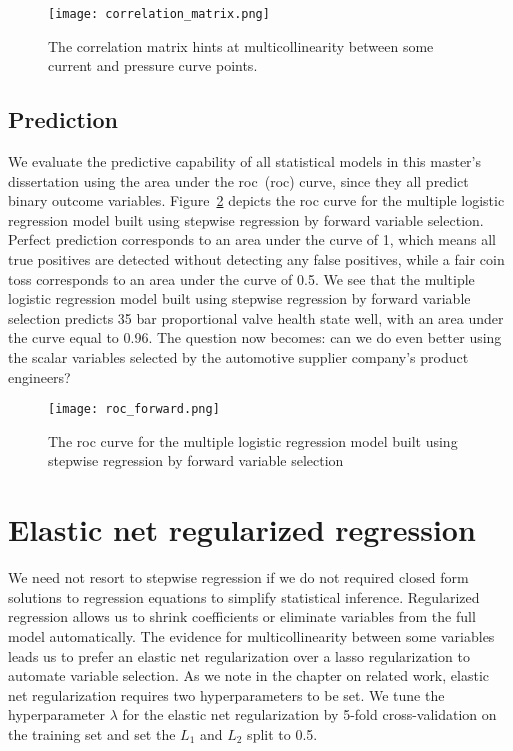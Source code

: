\begin{figure}
  \texttt{[image: correlation\_matrix.png]}
  \caption{The correlation matrix hints at multicollinearity between some current and pressure curve points.}
  \label{fig:correlation-matrix}
\end{figure}

\subsection{Prediction}

We evaluate the predictive capability of all statistical models in this master's dissertation using the area under the \acrlong{roc}~(\acrshort{roc}) curve, since they all predict binary outcome variables.
Figure~\ref{fig:roc-forward} depicts the \acrshort{roc} curve for the multiple logistic regression model built using stepwise regression by forward variable selection.
Perfect prediction corresponds to an area under the curve of 1, which means all true positives are detected without detecting any false positives, while a fair coin toss corresponds to an area under the curve of 0.5.
We see that the multiple logistic regression model built using stepwise regression by forward variable selection predicts 35 bar proportional valve health state well, with an area under the curve equal to 0.96.
The question now becomes: can we do even better using the scalar variables selected by the automotive supplier company's product engineers?

\begin{figure}
  \texttt{[image: roc\_forward.png]}
  \caption{The \acrshort{roc} curve for the multiple logistic regression model built using stepwise regression by forward variable selection}
  \label{fig:roc-forward}
\end{figure}

\section{Elastic net regularized regression}

We need not resort to stepwise regression if we do not required closed form solutions to regression equations to simplify statistical inference.
Regularized regression allows us to shrink coefficients or eliminate variables from the full model automatically.
The evidence for multicollinearity between some variables leads us to prefer an elastic net regularization over a \acrshort{lasso} regularization to automate variable selection.
As we note in the chapter on related work, elastic net regularization requires two hyperparameters to be set.
We tune the hyperparameter $\lambda$ for the elastic net regularization by 5-fold cross-validation on the training set and set the $L_{1}$ and $L_{2}$ split to 0.5.

